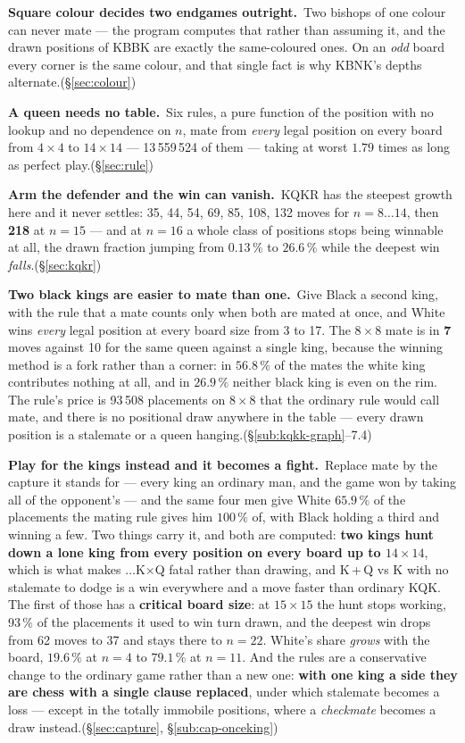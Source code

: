 \documentclass[11pt]{article}
\begin{document}
\smallskip
\noindent\textbf{Square colour decides two endgames outright.}\ Two bishops of
one colour can never mate --- the program computes that rather than assuming
it, and the drawn positions of KBBK are exactly the same-coloured ones. On an
\emph{odd} board every corner is the same colour, and that single fact is why
KBNK's depths alternate.\hfill(\S\ref{sec:colour})

\smallskip
\noindent\textbf{A queen needs no table.}\ Six rules, a pure function of the
position with no lookup and no dependence on $n$, mate from \emph{every} legal
position on every board from $4\times4$ to $14\times14$ --- 13\,559\,524 of
them --- taking at worst $1.79$ times as long as perfect play.\hfill(\S\ref{sec:rule})

\smallskip
\noindent\textbf{Arm the defender and the win can vanish.}\ KQKR has the
steepest growth here and it never settles: 35, 44, 54, 69, 85, 108, 132 moves
for $n = 8\ldots14$, then \textbf{218} at $n=15$ --- and at $n=16$ a whole class
of positions stops being winnable at all, the drawn fraction jumping from
$0.13\,\%$ to $26.6\,\%$ while the deepest win \emph{falls}.\hfill(\S\ref{sec:kqkr})

\smallskip
\noindent\textbf{Two black kings are easier to mate than one.}\ Give Black a
second king, with the rule that a mate counts only when both are mated at once,
and White wins \emph{every} legal position at every board size from 3 to 17.
The $8\times8$ mate is in \textbf{7} moves against 10 for the same queen
against a single king, because the winning method is a fork rather than a
corner: in $56.8\,\%$ of the mates the white king contributes nothing at all,
and in $26.9\,\%$ neither black king is even on the rim. The rule's price is
93\,508 placements on $8\times8$ that the ordinary rule would call mate, and
there is no positional draw anywhere in the table --- every drawn position is a
stalemate or a queen hanging.\hfill(\S\ref{sub:kqkk-graph}--7.4)

\smallskip
\noindent\textbf{Play for the kings instead and it becomes a fight.}\ Replace
mate by the capture it stands for --- every king an ordinary man, and the game
won by taking all of the opponent's --- and the same four men give White
$65.9\,\%$ of the placements the
mating rule gives him $100\,\%$ of, with Black holding a third and winning a
few. Two things carry it, and both are computed: \textbf{two kings hunt down a
lone king from every position on every board up to $14\times14$}, which is what
makes $\ldots$K$\times$Q fatal rather than drawing, and K\,+\,Q vs K with no
stalemate to dodge is a win everywhere and a move faster than ordinary KQK.
The first of those has a \textbf{critical board size}: at $15\times15$ the hunt
stops working, 93\,\% of the placements it used to win turn drawn, and the
deepest win drops from 62 moves to 37 and stays there to $n=22$.
White's share \emph{grows} with the board, $19.6\,\%$ at $n=4$ to $79.1\,\%$ at
$n=11$. And the rules are a conservative change to the ordinary game rather
than a new one: \textbf{with one king a side they are chess with a single
clause replaced}, under which stalemate becomes a loss --- except in the
totally immobile positions, where a \emph{checkmate} becomes a draw
instead.\hfill(\S\ref{sec:capture}, \S\ref{sub:cap-onceking})
\end{document}
